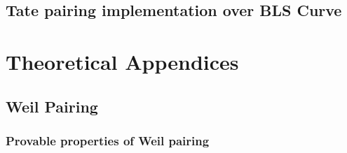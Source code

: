 \documentclass[twoside,11pt,openright]{report}
\theoremstyle{definition}
\begin{document}


%
%

\section{Tate pairing implementation over BLS Curve}



\chapter{Theoretical Appendices}
\label{apx_theory}
%

\section{Weil Pairing}

%

\subsection{Provable properties of Weil pairing}
\label{apx_theory__pairing_properties_weil}


%


%
\end{document}
